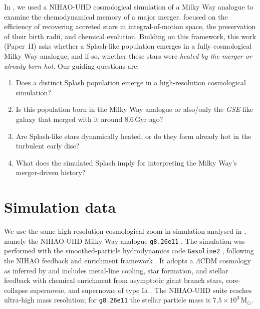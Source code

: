 \documentclass[fleqn,usenatbib]{mnras}
\begin{document}
In \citet[][hereafter Paper~I]{Buder2025c}, we used a NIHAO-UHD cosmological simulation of a Milky Way analogue \citep{Buck2020, Buck2021} to examine the chemodynamical memory of a major merger.  focused on the efficiency of recovering accreted stars in integral-of-motion space, the preservation of their birth radii, and chemical evolution. Building on this framework, this work (Paper~II) asks whether a Splash-like population emerges in a fully cosmological Milky Way analogue, and if so, whether these stars were \emph{heated by the merger or already born hot}. Our guiding questions are:
\begin{enumerate}[leftmargin=2em,labelwidth=0em]
    \item Does a distinct Splash population emerge in a high-resolution cosmological simulation?
    \item Is this population born in the Milky Way analogue or also/only the \textit{GSE}-like galaxy that merged with it around $8.6\,\mathrm{Gyr}$ ago?
    \item Are Splash-like stars dynamically heated, or do they form already hot in the turbulent early disc?
    \item What does the simulated Splash imply for interpreting the Milky Way’s merger-driven history?
\end{enumerate}

\section{Simulation data}
\label{sec:data}

We use the same high-resolution cosmological zoom-in simulation analysed in , namely the NIHAO-UHD Milky Way analogue \texttt{g8.26e11} \citep{Wang2015, Buck2019b, Buck2020b, Buck2021}. The simulation was performed with the smoothed-particle hydrodynamics code \texttt{Gasoline2} \citep{Wadsley2017}, following the NIHAO feedback and enrichment framework \citep{Stinson2006, Stinson2013, Wang2015}. It adopts a $\Lambda$CDM cosmology as inferred by \citet{Planck2014} and includes metal-line cooling, star formation, and stellar feedback with chemical enrichment from asymptotic giant branch stars, core-collapse supernovae, and supernovae of type Ia \citep{Buck2021}. The NIHAO-UHD suite reaches ultra-high mass resolution; for \texttt{g8.26e11} the stellar particle mass is $7.5 \times 10^3\,\mathrm{M_{\odot}}$.
\end{document}
